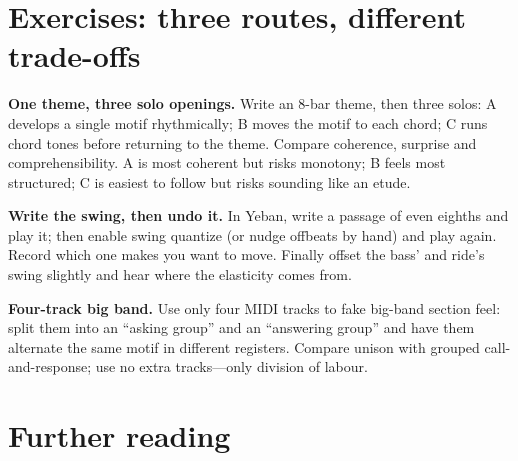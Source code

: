\section{Exercises: three routes, different trade-offs}
\label{sec:jazz-practice}

\begin{exercise}
\textbf{One theme, three solo openings.} Write an 8-bar theme, then three solos: A develops a single motif rhythmically; B moves the motif to each chord; C runs chord tones before returning to the theme. Compare coherence, surprise and comprehensibility. A is most coherent but risks monotony; B feels most structured; C is easiest to follow but risks sounding like an etude.
\end{exercise}

\begin{exercise}
\textbf{Write the swing, then undo it.} In Yeban, write a passage of even eighths and play it; then enable swing quantize (or nudge offbeats by hand) and play again. Record which one makes you want to move. Finally offset the bass' and ride's swing slightly and hear where the elasticity comes from.
\end{exercise}

\begin{exercise}
\textbf{Four-track big band.} Use only four MIDI tracks to fake big-band section feel: split them into an ``asking group'' and an ``answering group'' and have them alternate the same motif in different registers. Compare unison with grouped call-and-response; use no extra tracks---only division of labour.
\end{exercise}

\section{Further reading}
\label{sec:jazz-reading}


